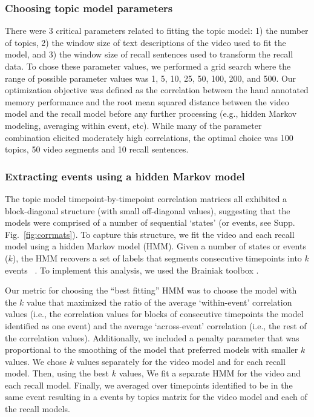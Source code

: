 \documentclass{article}
\begin{document}
\subsubsection*{Choosing topic model parameters}
There were 3 critical parameters related to fitting the topic model: 1) the number of topics, 2) the window size of text descriptions of the video used to fit the model, and 3) the window size of recall sentences used to transform the recall data.  To chose these parameter values, we performed a grid search where the range of possible parameter values was 1, 5, 10, 25, 50, 100, 200, and 500. Our optimization objective was defined as the correlation between the hand annotated memory performance and the root mean squared distance between the video model and the recall model before any further processing (e.g., hidden Markov modeling, averaging within event, etc). While many of the parameter combination elicited moderately high correlations, the optimal choice was 100 topics, 50 video segments and 10 recall sentences.

\subsubsection*{Extracting events using a hidden Markov model}
The topic model timepoint-by-timepoint correlation matrices all exhibited a block-diagonal structure (with small off-diagonal values), suggesting that the models were comprised of a number of sequential `states' (or events, see Supp. Fig.~\ref{fig:corrmats}). To capture this structure, we fit the video and each recall model using a hidden Markov model (HMM). Given a number of states or events ($k$), the HMM recovers a set of labels that segments consecutive timepoints into $k$ events ~\citep{Rabi89, BaldEtal17}. To implement this analysis, we used the Brainiak toolbox \citep{BaldEtal17, Brainiak}.

Our metric for choosing the ``best fitting'' HMM was to choose the model with the $k$ value that maximized the ratio of the average `within-event' correlation values (i.e., the correlation values for blocks of consecutive timepoints the model identified as one event) and the average `across-event' correlation (i.e., the rest of the correlation values). Additionally, we included a penalty parameter that was proportional to the smoothing of the model that preferred models with smaller $k$ values. We chose $k$ values separately for the video model and for each recall model.  Then, using the best $k$ values, We fit a separate HMM for the video and each recall model. Finally, we averaged over timepoints identified to be in the same event resulting in a events by topics matrix for the video model and each of the recall models.
\end{document}
